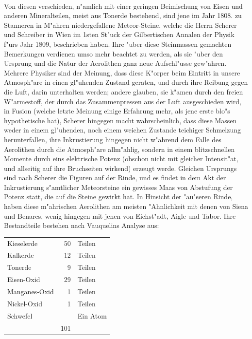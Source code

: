 \documentclass[a4paper, 11pt, oneside, polutonikogreek, german]{article}
\begin{document}
\paragraph{}
Von diesen verschieden, n"amlich mit einer geringen Beimischung von Eisen und anderen Mineralteilen, meist aus Tonerde bestehend, sind jene im Jahr 1808. zu Stanneren in M"ahren niedergefallene Meteor-Steine, welche die Herrn Scherer und Schreiber in Wien im 1sten St"uck der Gilbertischen Annalen der Physik f"urs Jahr 1809, beschrieben haben. Ihre "uber diese Steinmassen gemachten Bemerkungen verdienen umso mehr beachtet zu werden, als sie "uber den Ursprung und die Natur der Aerolithen ganz neue Aufschl"usse gew"ahren. Mehrere Physiker sind der Meinung, dass diese K"orper beim Eintritt in unsere Atmosph"are in einen gl"uhenden Zustand geraten, und durch ihre Reibung gegen die Luft, darin unterhalten werden; andere glauben, sie k"amen durch den freien W"armestoff, der durch das Zusammenpressen aus der Luft ausgeschieden wird, in Fusion (welche letzte Meinung einige Erfahrung mehr, als jene erste blo"s hypothetische hat), Scherer hingegen macht wahrscheinlich, dass diese Massen weder in einem gl"uhenden, noch einem weichen Zustande teichiger Schmelzung herunterfallen, ihre Inkrustierung hingegen nicht w"ahrend dem Falle des Aerolithen durch die Atmosph"are allm"ahlig, sondern in einem blitzschnellen Momente durch eins elektrische Potenz (obschon nicht mit gleicher Intensit"at, und allseitig auf ihre Bruchseiten wirkend) erzeugt werde. Gleichen Ursprungs sind nach Scherer die Figuren auf der Rinde, und es findet in dem Akt der Inkrustierung s"amtlicher Meteorsteine ein gewisses Maas von Abstufung der Potenz statt, die auf die Steine gewirkt hat. In Hinsicht der "au"seren Rinde, haben diese m"ahrischen Aerolithen am meisten "Ahnlichkeit mit denen von Siena und Benares, wenig hingegen mit jenen von Eichst"adt, Aigle und Tabor. Ihre Bestandteile bestehen nach Vauquelins Analyse aus:
\begin{table}[H]
    \centering
    \begin{tabular}{l r l}
        Kieselerde & 50 & Teilen \\
        Kalkerde & 12 & Teilen \\
        Tonerde & 9 & Teilen \\
        Eisen-Oxid & 29 & Teilen \\
        Manganes-Oxid & 1 & Teilen \\
        Nickel-Oxid & 1 & Teilen \\
        Schwefel & ~ & Ein Atom \\ \hline
         ~ & 101 & ~ \\ 
    \end{tabular}
\end{table}
\end{document}
